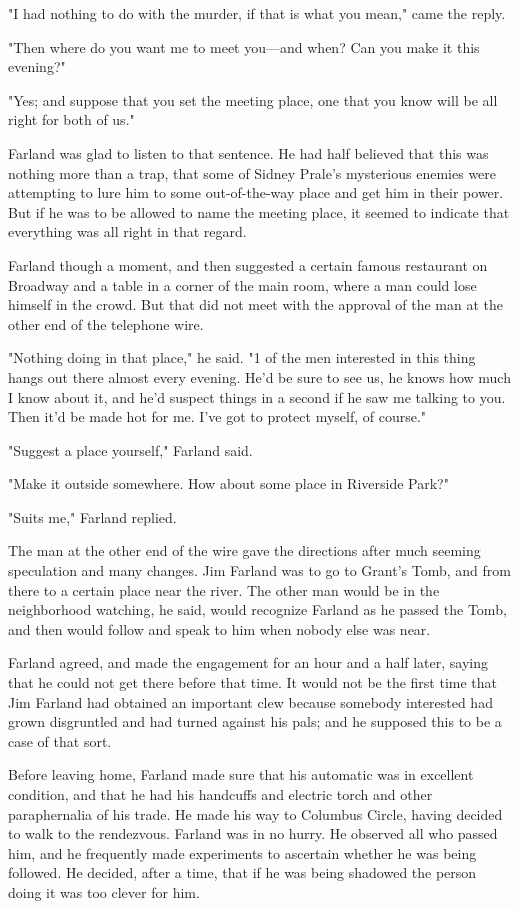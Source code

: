 \documentclass{novel}
\begin{document}
"I had nothing to do with the murder, if that is what you mean," came the reply.

"Then where do you want me to meet you---and when? Can you make it this evening?"

"Yes; and suppose that you set the meeting place, one that you know will be all right for both of us."

Farland was glad to listen to that sentence. He had half believed that this was nothing more than a trap, that some of Sidney Prale's mysterious enemies were attempting to lure him to some out-of-the-way place and get him in their power. But if he was to be allowed to name the meeting place, it seemed to indicate that everything was all right in that regard.

Farland though a moment, and then suggested a certain famous restaurant on Broadway and a table in a corner of the main room, where a man could lose himself in the crowd. But that did not meet with the approval of the man at the other end of the telephone wire.

"Nothing doing in that place," he said. "1 of the men interested in this thing hangs out there almost every evening. He'd be sure to see us, he knows how much I know about it, and he'd suspect things in a second if he saw me talking to you. Then it'd be made hot for me. I've got to protect myself, of course."

"Suggest a place yourself," Farland said.

"Make it outside somewhere. How about some place in Riverside Park?"

"Suits me," Farland replied.

The man at the other end of the wire gave the directions after much seeming speculation and many changes. Jim Farland was to go to Grant's Tomb, and from there to a certain place near the river. The other man would be in the neighborhood watching, he said, would recognize Farland as he passed the Tomb, and then would follow and speak to him when nobody else was near.

Farland agreed, and made the engagement for an hour and a half later, saying that he could not get there before that time. It would not be the first time that Jim Farland had obtained an important clew because somebody interested had grown disgruntled and had turned against his pals; and he supposed this to be a case of that sort.

Before leaving home, Farland made sure that his automatic was in excellent condition, and that he had his handcuffs and electric torch and other paraphernalia of his trade. He made his way to Columbus Circle, having decided to walk to the rendezvous. Farland was in no hurry. He observed all who passed him, and he frequently made experiments to ascertain whether he was being followed. He decided, after a time, that if he was being shadowed the person doing it was too clever for him.
\end{document}
